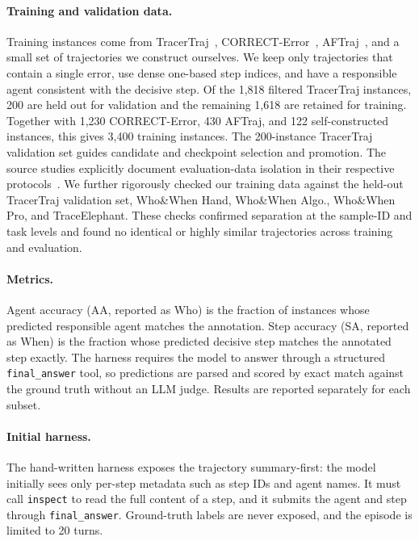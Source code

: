 \documentclass[11pt,a4paper]{article}
\begin{document}
\paragraph{Training and validation data.}
Training instances come from TracerTraj~\citep{zhang2025agentracer}, CORRECT-Error~\citep{yu2026correct}, AFTraj~\citep{zhang2026agentforesight}, and a small set of trajectories we construct ourselves. We keep only trajectories that contain a single error, use dense one-based step indices, and have a responsible agent consistent with the decisive step. Of the 1,818 filtered TracerTraj instances, 200 are held out for validation and the remaining 1,618 are retained for training. Together with 1,230 CORRECT-Error, 430 AFTraj, and 122 self-constructed instances, this gives 3,400 training instances. The 200-instance TracerTraj validation set guides candidate and checkpoint selection and promotion. The source studies explicitly document evaluation-data isolation in their respective protocols~\citep{zhang2025agentracer,yu2026correct,zhang2026agentforesight}. We further rigorously checked our training data against the held-out TracerTraj validation set, Who\&When Hand, Who\&When Algo., Who\&When Pro, and TraceElephant. These checks confirmed separation at the sample-ID and task levels and found no identical or highly similar trajectories across training and evaluation.

\paragraph{Metrics.}
Agent accuracy (AA, reported as Who) is the fraction of instances whose predicted responsible agent matches the annotation. Step accuracy (SA, reported as When) is the fraction whose predicted decisive step matches the annotated step exactly. The harness requires the model to answer through a structured \texttt{final\_answer} tool, so predictions are parsed and scored by exact match against the ground truth without an LLM judge. Results are reported separately for each subset.

\paragraph{Initial harness.}
The hand-written harness exposes the trajectory summary-first: the model initially sees only per-step metadata such as step IDs and agent names. It must call \texttt{inspect} to read the full content of a step, and it submits the agent and step through \texttt{final\_answer}. Ground-truth labels are never exposed, and the episode is limited to 20 turns.
\end{document}
